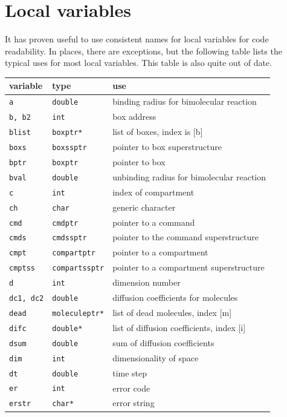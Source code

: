 \documentclass {scrbook}
\newcommand {\ttt} {\texttt}
\begin{document}
\section{Local variables}

It has proven useful to use consistent names for local variables for code readability. In places, there are exceptions, but the following table lists the typical uses for most local variables. This table is also quite out of date.

\begin{longtable}[c]{lll}
variable & type & use\\
\hline
\ttt{a} & \ttt{double} & binding radius for bimolecular reaction\\
\ttt{b, b2} & \ttt{int} & box address\\
\ttt{blist} & \ttt{boxptr*} & list of boxes, index is [b]\\
\ttt{boxs} & \ttt{boxssptr} & pointer to box superstructure\\
\ttt{bptr} & \ttt{boxptr} & pointer to box\\
\ttt{bval} & \ttt{double} & unbinding radius for bimolecular reaction\\
\ttt{c} & \ttt{int} & index of compartment\\
\ttt{ch} & \ttt{char} & generic character\\
\ttt{cmd} & \ttt{cmdptr} & pointer to a command\\
\ttt{cmds} & \ttt{cmdssptr} & pointer to the command superstructure\\
\ttt{cmpt} & \ttt{compartptr} & pointer to a compartment\\
\ttt{cmptss} & \ttt{compartssptr} & pointer to a compartment superstructure\\
\ttt{d} & \ttt{int} & dimension number\\
\ttt{dc1, dc2} & \ttt{double} & diffusion coefficients for molecules\\
\ttt{dead} & \ttt{moleculeptr*} & list of dead molecules, index [m]\\
\ttt{difc} & \ttt{double*} & list of diffusion coefficients, index [i]\\
\ttt{dsum} & \ttt{double} & sum of diffusion coefficients\\
\ttt{dim} & \ttt{int} & dimensionality of space\\
\ttt{dt} & \ttt{double} & time step\\
\ttt{er} & \ttt{int} & error code\\
\ttt{erstr} & \ttt{char*} & error string\\

\end{longtable}
\end{document}
